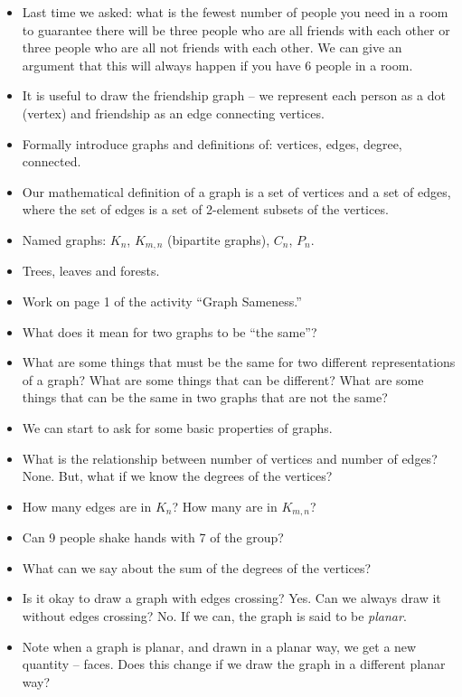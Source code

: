 \documentclass[12pt]{article}
\theoremstyle{plain}
\theoremstyle{definition}
\theoremstyle{remark}
\begin{document}
\begin{itemize}
\item Last time we asked: what is the fewest number of people you need in a room to guarantee there will be three people who are all friends with each other or three people who are all not friends with each other.  We can give an argument that this will always happen if you have 6 people in a room.
\item It is useful to draw the friendship graph -- we represent each person as a dot (vertex) and friendship as an edge connecting vertices.
  \item Formally introduce graphs and definitions of: vertices, edges, degree, connected.
  \item Our mathematical definition of a graph is a set of vertices and a set of edges, where the set of edges is a set of 2-element subsets of the vertices.

  \item Named graphs: $K_n$, $K_{m,n}$ (bipartite graphs), $C_n$, $P_n$.
  \item Trees, leaves and forests.
  \item Work on page 1 of the activity ``Graph Sameness.''
  \item What does it mean for two graphs to be ``the same''?
  \item What are some things that must be the same for two different representations of a graph?  What are some things that can be different?  What are some things that can be the same in two graphs that are not the same?

  \item We can start to ask for some basic properties of graphs.

  \item What is the relationship between number of vertices and number of edges?  None.  But, what if we know the degrees of the vertices?
  \item How many edges are in $K_n$?  How many are in $K_{m,n}$?
  \item Can 9 people shake hands with 7 of the group?
  \item What can we say about the sum of the degrees of the vertices?


  \item Is it okay to draw a graph with edges crossing?  Yes.  Can we always draw it without edges crossing?  No.  If we can, the graph is said to be {\em planar}.
  \item  Note when a graph is planar, and drawn in a planar way, we get a new quantity -- faces.  Does this change if we draw the graph in a different planar way?


\end{itemize}
\end{document}
